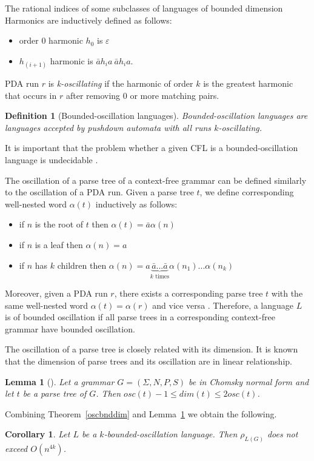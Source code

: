 \documentclass[11pt,a4paper]{article} %
\newtheorem{lemma}{Lemma}
\newtheorem{definition}{Definition}
\newtheorem{corollary}{Corollary}
\begin{document}
\begin{subsection}{The rational indices of some subclasses of languages of bounded dimension}
Harmonics are inductively defined as follows:
\begin{itemize}
\item  order 0 harmonic $h_0$ is $\varepsilon$
\item  $h_{(i+1)}$ harmonic is $\bar{a}h_ia\ \bar{a}h_ia$.
\end{itemize}

PDA run $r$ is \textit{k-oscillating} if the harmonic of order $k$ is the greatest harmonic that occurs in $r$ after removing $0$ or more matching pairs. 

\begin{definition}[Bounded-oscillation languages]
Bounded-oscillation languages are languages accepted by pushdown automata with all runs $k$-oscillating. 
\end{definition}
It is important that the problem whether a given CFL is a bounded-oscillation language is undecidable \cite{BoundOsc}.

The oscillation of a parse tree of a context-free grammar can be defined similarly to the oscillation of a PDA run. Given a parse tree $t$, we define corresponding well-nested word $\alpha(t)$ inductively as follows:
\begin{itemize}
\item if $n$ is the root of $t$ then $\alpha(t) = \bar{a}\alpha(n)$
\item if $n$ is a leaf then $\alpha(n)=a$
\item if $n$ has $k$ children then $\alpha(n) = a\underbrace{\bar{a}...\bar{a}}_\text{$k$ times}\alpha(n_1)...\alpha(n_k)$
\end{itemize}


Moreover, given a PDA run $r$, there exists a corresponding parse tree $t$ with the same well-nested word $\alpha(t)=\alpha(r)$ and vice versa \cite{BoundOsc}. Therefore, a language $L$ is of bounded oscillation if all parse trees in a corresponding context-free grammar have bounded oscillation.


The oscillation of a parse tree is closely related with its dimension. 
It is known that the dimension of parse trees and its oscillation are in linear relationship.

\begin{lemma}[\cite{BoundOsc}]
\label{boscdim}
Let a grammar $G = (\Sigma, N, P, S)$ be in Chomsky normal form and let $t$ be a parse tree of $G$. Then $osc(t) - 1 \le dim(t) \le 2osc(t)$.
\end{lemma}
Combining Theorem~\ref{oscbnddim} and Lemma~\ref{boscdim} we obtain the following.
\begin{corollary}
Let $L$ be a $k$-bounded-oscillation language. Then $\rho_{L(G)}$ does not exceed $O(n^{4k})$.
\end{corollary}



\end{subsection}
\end{document}
